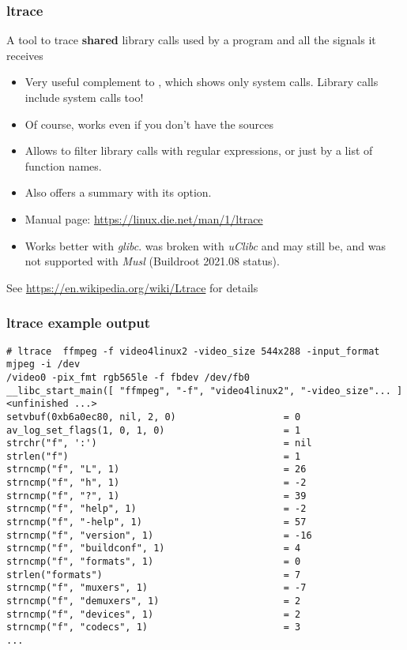 \begin{frame}
  \frametitle{ltrace}
  A tool to trace {\bf shared} library calls used by a program and all the signals
  it receives
  \begin{itemize}
  \item Very useful complement to , which shows only system
    calls. Library calls include system calls too!
  \item Of course, works even if you don't have the sources
  \item Allows to filter library calls with regular expressions, or
    just by a list of function names.
  \item Also offers a summary with its  option.
  \item Manual page: \url{https://linux.die.net/man/1/ltrace}
  \item Works better with {\em glibc}.  was broken
        with {\em uClibc} and may still be, and was not supported
        with {\em Musl} (Buildroot 2021.08 status).
  \end{itemize}
  See \url{https://en.wikipedia.org/wiki/Ltrace} for details
\end{frame}

\begin{frame}[fragile]
  \frametitle{ltrace example output}
  \scriptsize
  \begin{block}{}
\begin{verbatim}
# ltrace  ffmpeg -f video4linux2 -video_size 544x288 -input_format mjpeg -i /dev
/video0 -pix_fmt rgb565le -f fbdev /dev/fb0
__libc_start_main([ "ffmpeg", "-f", "video4linux2", "-video_size"... ] <unfinished ...>
setvbuf(0xb6a0ec80, nil, 2, 0)                   = 0
av_log_set_flags(1, 0, 1, 0)                     = 1
strchr("f", ':')                                 = nil
strlen("f")                                      = 1
strncmp("f", "L", 1)                             = 26
strncmp("f", "h", 1)                             = -2
strncmp("f", "?", 1)                             = 39
strncmp("f", "help", 1)                          = -2
strncmp("f", "-help", 1)                         = 57
strncmp("f", "version", 1)                       = -16
strncmp("f", "buildconf", 1)                     = 4
strncmp("f", "formats", 1)                       = 0
strlen("formats")                                = 7
strncmp("f", "muxers", 1)                        = -7
strncmp("f", "demuxers", 1)                      = 2
strncmp("f", "devices", 1)                       = 2
strncmp("f", "codecs", 1)                        = 3
...
\end{verbatim}
\end{block}
\end{frame}

